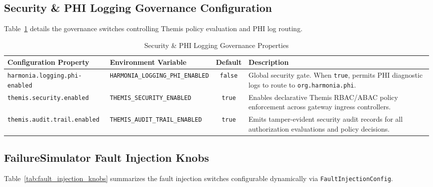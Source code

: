 \subsection{Security \& PHI Logging Governance Configuration}

Table~\ref{tab:security_logging_config} details the governance switches controlling Themis policy evaluation and PHI log routing.

\begin{table}[htbp]
\centering
\small
\begin{tabularx}{\textwidth}{l l c X}
\toprule
\textbf{Configuration Property} & \textbf{Environment Variable} & \textbf{Default} & \textbf{Description} \\
\midrule
\texttt{harmonia.logging.phi-enabled} & \texttt{HARMONIA\_LOGGING\_PHI\_ENABLED} & \texttt{false} & Global security gate. When \texttt{true}, permits PHI diagnostic logs to route to \texttt{org.harmonia.phi}. \\
\addlinespace
\texttt{themis.security.enabled} & \texttt{THEMIS\_SECURITY\_ENABLED} & \texttt{true} & Enables declarative Themis RBAC/ABAC policy enforcement across gateway ingress controllers. \\
\addlinespace
\texttt{themis.audit.trail.enabled} & \texttt{THEMIS\_AUDIT\_TRAIL\_ENABLED} & \texttt{true} & Emits tamper-evident security audit records for all authorization evaluations and policy decisions. \\
\bottomrule
\end{tabularx}
\caption{Security \& PHI Logging Governance Properties}
\label{tab:security_logging_config}
\end{table}

\subsection{FailureSimulator Fault Injection Knobs}

Table~\ref{tab:fault_injection_knobs} summarizes the fault injection switches configurable dynamically via \texttt{FaultInjectionConfig}.

